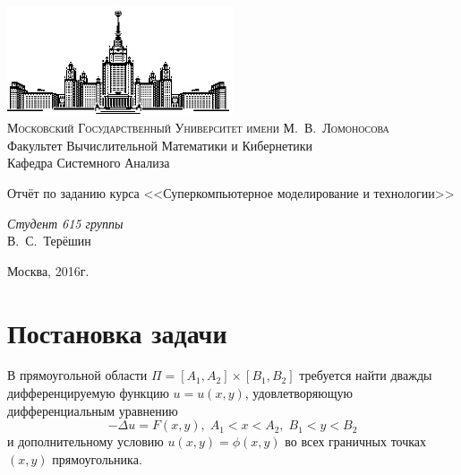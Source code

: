 \documentclass[12pt]{article}
\theoremstyle{rusdef}
\begin{document}
	\thispagestyle{empty}
	
	\begin{center}
		\ \vspace{-3cm}
		
		\includegraphics[width=0.5\textwidth]{msu.eps}\\
		
		{\scshape Московский Государственный Университет имени М.~В.~Ломоносова}\\
		Факультет Вычислительной Математики и Кибернетики\\
		Кафедра Системного Анализа
		\vfill
		
		{\LARGE Отчёт по заданию курса <<Суперкомпьютерное моделирование и технологии>>}
		\vspace{.5cm}
		
	\end{center}
	
	\vspace{1cm}
	
	\begin{flushright}
		\large
		\textit{Студент 615 группы}\\
		В.~С.~Терёшин\\
		
	\end{flushright}
	
	\vfill
	
	\begin{center}
		{\large
			Москва, 2016г.}
	\end{center}
	
	\newpage
	\tableofcontents
	\newpage
	
	\section{Постановка задачи}
	
	В прямоугольной области $\Pi = [A_1,A_2] \times [B_1,B_2]$ требуется найти дважды дифференцируемую функцию $u=u(x,y)$, удовлетворяющую дифференциальным уравнению
	$$-\Delta u=F(x,y),\;A_1<x<A_2,\;B_1<y<B_2$$
	и дополнительному условию $u(x,y)=\phi(x,y)$ во всех граничных точках $(x,y)$ прямоугольника.
\end{document}
